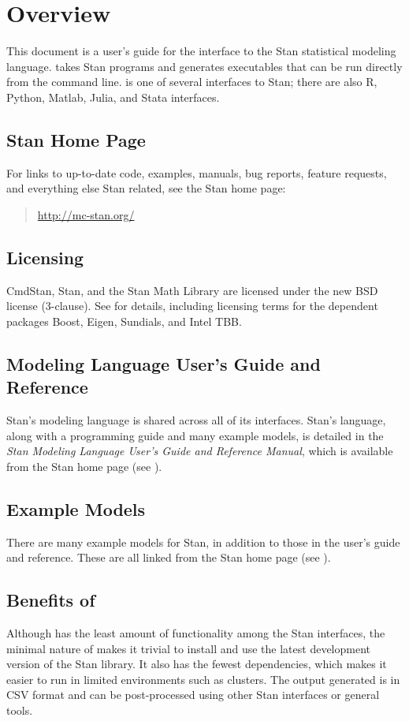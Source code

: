 \chapter{Overview}

\noindent
This document is a user's guide for the \CmdStan interface to the
Stan statistical modeling language. \CmdStan takes Stan programs
and generates executables that can be run directly from the command
line. \CmdStan is one of several interfaces to Stan; there are also R,
Python, Matlab, Julia, and Stata interfaces.

\section{Stan Home Page}\label{home-page.section}

For links to up-to-date code, examples, manuals, bug reports, feature
requests, and everything else Stan related, see the Stan home page:
%
\begin{quote}
\url{http://mc-stan.org/}
\end{quote}


\section{Licensing}

CmdStan, Stan, and the Stan Math Library are licensed under the new
BSD license (3-clause).  See  for details,
including licensing terms for the dependent packages Boost, Eigen,
Sundials, and Intel TBB.


\section{Modeling Language User's Guide and Reference}

Stan's modeling language is shared across all of its interfaces.
Stan's language, along with a programming guide and many example
models, is detailed in the {\it Stan Modeling Language User's Guide
  and Reference Manual}, which is available from the Stan home page
(see ).

\section{Example Models}

There are many example models for Stan, in addition to those in the
user's guide and reference. These are all linked from the Stan home
page (see ).


\section{Benefits of \CmdStan}

Although \CmdStan has the least amount of functionality among the
Stan interfaces, the minimal nature of \CmdStan makes it trivial to
install and use the latest development version of the Stan
library. It also has the fewest dependencies, which makes it easier to
run in limited environments such as clusters. The output generated is
in CSV format and can be post-processed using other Stan interfaces or
general tools.
